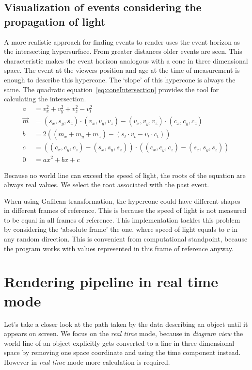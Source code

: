 \documentclass{egpubl}
\begin{document}
\subsection{Visualization of events considering the propagation of light}
\label{visConsLight}
A more realistic approach for finding events to render uses the event horizon as the intersecting hypersurface. From greater distances older events are seen. This characteristic makes the event horizon analogous with a cone in three dimensional space. The event at the viewers position and age at the time of measurement is enough to describe this hypercone. The  `slope' of this hypercone is always the same. The quadratic equation~\ref{eq:coneIntersection} provides the tool for calculating the intersection.
\begin{align}
a &= v_x^2 + v_y^2 + v_z^2 - v_t^2\\
\vec{m} &= (s_x, s_y, s_z)\cdot{}(v_x, v_y, v_z) - (v_x, v_y, v_z)\cdot{}(c_x, c_y, c_z)\\
b &= 2((m_x + m_y + m_z) - (s_t\cdot{}v_t - v_t\cdot{}c_t))\\
c &= ((c_x, c_y, c_z) - (s_x, s_y, s_z))\cdot{}((c_x, c_y, c_z) - (s_x, s_y, s_z))\\
0 &=ax^2 + bx + c
\label{eq:coneIntersection}
\end{align}

Because no world line can exceed the speed of light, the roots of the equation are always real values. We select the root associated with the past event. 

When using Galilean transformation, the hypercone could have different shapes in different frames of reference. This is because the speed of light is not measured to be equal in all frames of reference. This implementation tackles this problem by considering the `absolute frame' the one, where speed of light equals to $c$ in any random direction. This is convenient from computational standpoint, because the program works with values represented in this frame of reference anyway.

\section{Rendering pipeline in real time mode}
Let's take a closer look at the path taken by the data describing an object until it appears on screen. We focus on the \emph{real time} mode, because in \emph{diagram view} the world line of an object explicitly gets converted to a line in three dimensional space by removing one space coordinate and using the time component instead. However in \emph{real time} mode more calculation is required.
\end{document}

